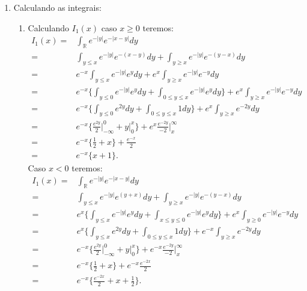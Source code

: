 \documentclass{article}
\begin{document}
\begin{enumerate}
\begin{enumerate}
\begin{enumerate}
					\item Calculando as integrais:
					\begin{enumerate}
						\item Calculando $I_{1}(x)$ caso $x \geq 0$ teremos:
						$$
						\begin{aligned}
						I_{1}(x) 
						= & \int_{\mathbb{R}}e^{-|y|}e^{-|x-y|} dy \\
						= & \int_{y \leq x }e^{-|y|}e^{-(x-y)} dy + \int_{y \geq x }e^{-|y|}e^{-(y - x)} dy \\
						= & e^{-x}\int_{y \leq x }e^{-|y|}e^{y} dy + e^{x}\int_{y \geq x }e^{-|y|}e^{-y} dy \\
						= & e^{-x} \Big\{ \int_{y \leq 0 }e^{-|y|}e^{y} dy + \int_{0 \leq y \leq x }e^{-|y|}e^{y} dy \Big\}+ e^{x}\int_{y \geq x }e^{-|y|}e^{-y} dy \\
						= & e^{-x} \Big\{ \int_{y \leq 0 }e^{2y} dy + \int_{0 \leq y \leq x } 1 dy \Big\}+ e^{x}\int_{y \geq x }e^{-2y} dy \\
						= & e^{-x} \Big\{ \frac{e^{2y}}{2} \Big|^{0}_{-\infty} + y \Big|^{x}_{0}\Big\}+ e^{x} \frac{e^{-2y}}{-2}\Big|^{\infty}_{x}\\
						= & e^{-x} \Big\{ \frac{1}{2} + x \Big\} + \frac{e^{-x}}{2}\\
						= & e^{-x} \Big\{ x + 1\Big\}.
						\end{aligned}
						$$
						Caso $x < 0$ teremos:
						$$
						\begin{aligned}
						I_{1}(x) 
						= & \int_{\mathbb{R}}e^{-|y|}e^{-|x-y|} dy \\
						= & \int_{y \leq x }e^{-|y|}e^{(y+x)} dy + \int_{y \geq x }e^{-|y|}e^{-(y - x)} dy \\
						= & e^{x} \Big\{ \int_{y \leq x }e^{-|y|}e^{y} dy + \int_{x \leq y \leq 0 }e^{-|y|}e^{y} dy \Big\}+ e^{x}\int_{y \geq 0 }e^{-|y|}e^{-y} dy \\
						= & e^{x} \Big\{ \int_{y \leq x}e^{2y} dy + \int_{0 \leq y \leq x } 1 dy \Big\}+ e^{-x}\int_{y \geq x }e^{-2y} dy \\
						= & e^{-x} \Big\{ \frac{e^{2y}}{2} \Big|^{0}_{-\infty} + y \Big|^{x}_{0}\Big\}+ e^{-x} \frac{e^{-2y}}{-2}\Big|^{\infty}_{x}\\
						= & e^{-x} \Big\{ \frac{1}{2} + x \Big\} + e^{-x} \frac{e^{-2x}}{2}\\
						= & e^{-x} \Big\{ \frac{e^{-2x}}{2} + x + \frac{1}{2} \Big\}.
						\end{aligned}
						$$
						

\end{enumerate}
\end{enumerate}
\end{enumerate}
\end{enumerate}
\end{document}
